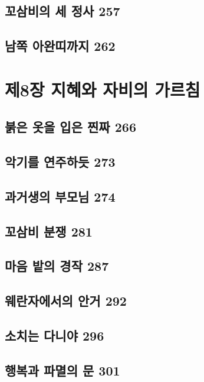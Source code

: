 \documentclass[12pt, a4paper, oneside]{book}
\let\stdsection\section
\renewcommand\section{\newpage\stdsection}
\begin{document}
	\section{꼬삼비의 세 정사 257 }

	\section{남쪽 아완띠까지 262}



	\chapter{제8장 지혜와 자비의 가르침}
	\noptcrule
	\parttoc				


	\section{붉은 옷을 입은 찐짜 266 }

	\section{악기를 연주하듯 273 }

	\section{과거생의 부모님 274 }

	\section{꼬삼비 분쟁 281 }

	\section{마음 밭의 경작 287 }

	\section{웨란자에서의 안거 292 }

	\section{소치는 다니야 296 }

	\section{행복과 파멸의 문 301 }
\end{document}
